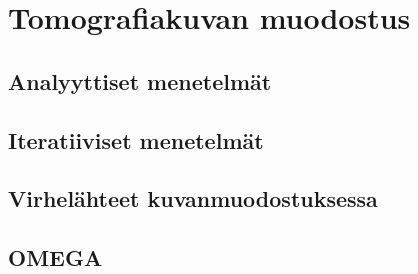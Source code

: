 \section{Tomografiakuvan muodostus}
\subsection{Analyyttiset menetelmät}
\subsection{Iteratiiviset menetelmät}
\subsection{Virhelähteet kuvanmuodostuksessa}
\subsection{OMEGA}